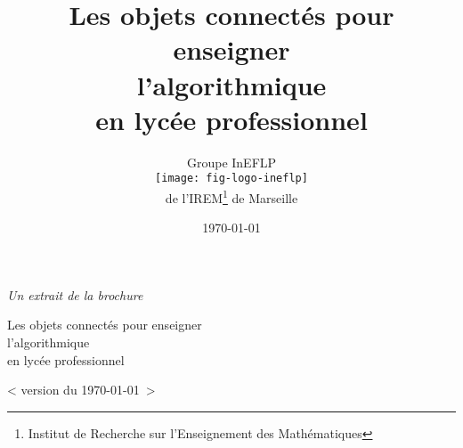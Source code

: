\documentclass[10pt]{article}
\title{%
    Les objets connectés pour enseigner\\
    l'algorithmique\\
    en lycée professionnel}
\author{%
    Groupe InEFLP\\
    \texttt{[image: fig-logo-ineflp]}\\
    de l'IREM\footnote{Institut de Recherche sur l'Enseignement des Mathématiques} de Marseille
    }
\date{\today}
\begin{document}
\newpage\nopagecolor





\newpage




\begin{center}
    {\footnotesize \textit{Un extrait de la brochure}}

    {\Large Les objets connectés pour enseigner\\
    l'algorithmique\\
    en lycée professionnel}



{\small < version du \today~>}

\end{center}
\end{document}
